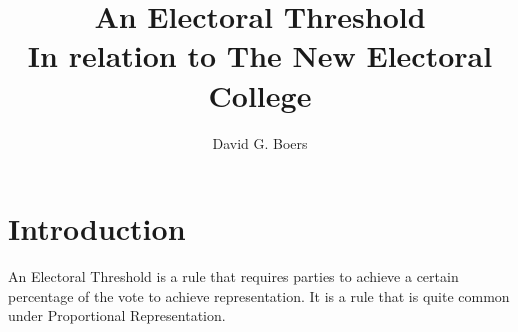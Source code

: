 \documentclass{article}
\title{
    An Electoral Threshold\\
    \large In relation to The New Electoral College}
\author{David G. Boers}
\begin{document}
    \maketitle

    \section{Introduction}

    An Electoral Threshold is a rule that requires parties to achieve a certain percentage of the vote to achieve representation. It is a rule that is quite common under Proportional Representation.
\end{document}

